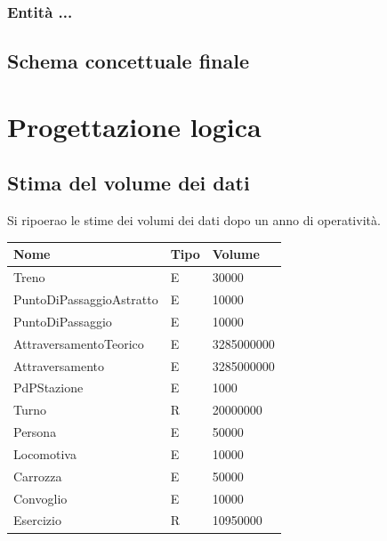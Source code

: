 \documentclass[a4paper,12pt]{report}
\begin{document}
	\subsection{Entità ...}
	\section{Schema concettuale finale}
	\chapter{Progettazione logica}
	\section{Stima del volume dei dati}
	\par Si ripoerao le stime dei volumi dei dati dopo un anno di operatività.
	\begin{table}[H]
	\centering
	\begin{tabular}{|l|l|l|}
		\hline Nome & Tipo & Volume \\
		\hline Treno & E & 30000 \\
		\hline PuntoDiPassaggioAstratto & E & 10000 \\
		\hline PuntoDiPassaggio & E & 10000 \\
		\hline AttraversamentoTeorico & E & 3285000000 \\
		\hline Attraversamento & E & 3285000000 \\
		\hline PdPStazione & E &  1000 \\
		\hline Turno & R & 20000000 \\
		\hline Persona & E & 50000 \\
		\hline Locomotiva & E & 10000 \\
		\hline Carrozza & E & 50000 \\
		\hline Convoglio & E & 10000 \\
		\hline Esercizio & R & 10950000 \\
		\hline
	\end{tabular}
	\end{table}
\end{document}
